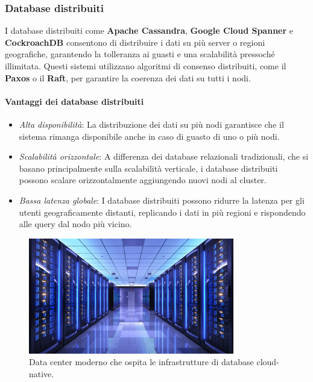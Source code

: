 \subsubsection{Database distribuiti}
I database distribuiti come \textbf{Apache Cassandra}, \textbf{Google Cloud Spanner} e \textbf{CockroachDB} consentono di distribuire i dati su più server o regioni geografiche, garantendo la tolleranza ai guasti e una scalabilità pressoché illimitata. Questi sistemi utilizzano algoritmi di consenso distribuiti, come il \textbf{Paxos} o il \textbf{Raft}, per garantire la coerenza dei dati su tutti i nodi.

\paragraph{Vantaggi dei database distribuiti}
\begin{itemize}
    \item \textit{Alta disponibilità}: La distribuzione dei dati su più nodi garantisce che il sistema rimanga disponibile anche in caso di guasto di uno o più nodi.
    \item \textit{Scalabilità orizzontale}: A differenza dei database relazionali tradizionali, che si basano principalmente sulla scalabilità verticale, i database distribuiti possono scalare orizzontalmente aggiungendo nuovi nodi al cluster.
    \item \textit{Bassa latenza globale}: I database distribuiti possono ridurre la latenza per gli utenti geograficamente distanti, replicando i dati in più regioni e rispondendo alle query dal nodo più vicino.
\end{itemize}

\begin{figure}[h]
    \centering
    \includegraphics[width=0.8\textwidth]{sources/data-center-scaled.jpeg}
    \caption{Data center moderno che ospita le infrastrutture di database cloud-native.}
    \label{fig:datacenter_cloud}
\end{figure}

